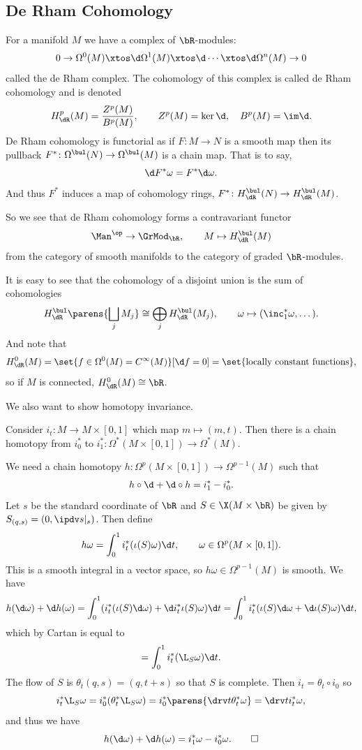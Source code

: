 \subsection{De Rham Cohomology}

For a manifold $M$ we have a complex of $\bR$-modules:
$$ 0 \to \Omega^0(M) \xtos\d \Omega^1(M) \xtos\d \cdots \xtos\d \Omega^n(M) \to 0 $$
called the {\emphcolor de Rham complex}.
The cohomology of this complex is called {\emphcolor de Rham cohomology} and is denoted
$$ H^p_\dR(M) = \frac{Z^p(M)}{B^p(M)},\qquad Z^p(M) = \ker\d,\quad B^p(M) = \im\d . $$
De Rham cohomology is functorial as if $F\colon M\to N$ is a smooth map then its pullback
$F^*\colon\Omega^\bul(N)\to\Omega^\bul(M)$ is a chain map.
That is to say,
$$ \d F^*\omega = F^*\d\omega . $$
And thus $F^*$ induces a map of cohomology rings, $F^*\colon H^\bul_\dR(N)\to H^\bul_\dR(M)$.

So we see that de Rham cohomology forms a contravariant functor
$$ \Man^\op \to \GrMod_\bR,\qquad M\mapsto H^\bul_\dR(M) $$
from the category of smooth manifolds to the category of graded $\bR$-modules.

It is easy to see that the cohomology of a disjoint union is the sum of cohomologies
$$ H^\bul_\dR\parens{\bigsqcup_jM_j} \cong \bigoplus_jH^\bul_\dR(M_j),\qquad \omega \mapsto (\inc_1^*\omega,\dots) . $$
And note that
$$ H^0_\dR(M) = \set{f\in\Omega^0(M)=C^\infty(M)}[\d f=0] = \set{\text{locally constant functions}} , $$
so if $M$ is connected, $H^0_\dR(M)\cong\bR$.

We also want to show homotopy invariance.

\blemm

    Consider $i_t\colon M\to M\times[0,1]$ which map $m\mapsto(m,t)$.
    Then there is a chain homotopy from $i_0^*$ to $i_1^*\colon\Omega^*(M\times[0,1])\to\Omega^*(M)$.

\elemm

\bproof

    We need a chain homotopy $h\colon\Omega^p(M\times[0,1])\to\Omega^{p-1}(M)$ such that
    $$ h\circ\d + \d\circ h = i_1^* - i_0^* . $$
    Let $s$ be the standard coordinate of $\bR$ and $S\in\X(M\times\bR)$ be given by $S_{(q,s)}=(0,\ipdv s|_s)$.
    Then define
    $$ h\omega = \int_0^1i_t^*(\iota(S)\omega)\d t,\qquad \omega \in \Omega^p(M\times[0,1]) . $$
    This is a smooth integral in a vector space, so $h\omega\in\Omega^{p-1}(M)$ is smooth.
    We have
    $$ h(\d\omega) + \d h(\omega) = \int_0^1(i_t^*(\iota(S)\d\omega) + \d i_t^*\iota(S)\omega)\d t
    = \int_0^1i_t^*(\iota(S)\d\omega + \d\iota(S)\omega)\d t , $$
    which by Cartan is equal to
    $$ = \int_0^1i_t^*(\L_S\omega)\d t . $$
    The flow of $S$ is $\theta_t(q,s)=(q,t+s)$ so that $S$ is complete.
    Then $i_t=\theta_t\circ i_0$ so
    $$ i_t^*\L_S\omega = i_0^*(\theta_t^*\L_S\omega) = i_0^*\parens{\drv t\theta_t^*\omega} = \drv ti_t^*\omega , $$
    and thus we have
    $$ h(\d\omega) + \d h(\omega) = i_1^*\omega - i_0^*\omega . \qed $$

